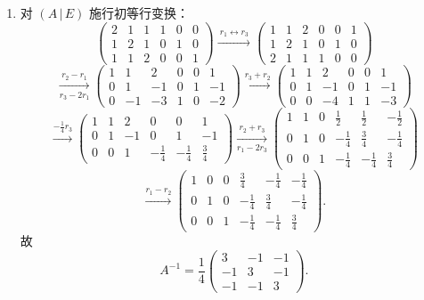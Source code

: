 \documentclass[12pt]{ctexart}
\begin{document}
\begin{enumerate}[label=\textbf{\arabic*.},itemsep=13pt]
\item 对 $(A\,|\,E)$ 施行初等行变换：
  \[
  \left(\begin{array}{ccc|ccc}
  2&1&1&1&0&0\\ 1&2&1&0&1&0\\ 1&1&2&0&0&1
  \end{array}\right)
  \xrightarrow{\ r_1\leftrightarrow r_3\ }
  \left(\begin{array}{ccc|ccc}
  1&1&2&0&0&1\\ 1&2&1&0&1&0\\ 2&1&1&1&0&0
  \end{array}\right)
  \]
  \[
  \xrightarrow[r_3-2r_1]{r_2-r_1}
  \left(\begin{array}{ccc|ccc}
  1&1&2&0&0&1\\ 0&1&-1&0&1&-1\\ 0&-1&-3&1&0&-2
  \end{array}\right)
  \xrightarrow{r_3+r_2}
  \left(\begin{array}{ccc|ccc}
  1&1&2&0&0&1\\ 0&1&-1&0&1&-1\\ 0&0&-4&1&1&-3
  \end{array}\right)
  \]
  \[
  \xrightarrow{-\frac14 r_3}
  \left(\begin{array}{ccc|ccc}
  1&1&2&0&0&1\\ 0&1&-1&0&1&-1\\ 0&0&1&-\frac14&-\frac14&\frac34
  \end{array}\right)
  \xrightarrow[r_1-2r_3]{r_2+r_3}
  \left(\begin{array}{ccc|ccc}
  1&1&0&\frac12&\frac12&-\frac12\\ 0&1&0&-\frac14&\frac34&-\frac14\\ 0&0&1&-\frac14&-\frac14&\frac34
  \end{array}\right)
  \]
  \[
  \xrightarrow{r_1-r_2}
  \left(\begin{array}{ccc|ccc}
  1&0&0&\frac34&-\frac14&-\frac14\\ 0&1&0&-\frac14&\frac34&-\frac14\\ 0&0&1&-\frac14&-\frac14&\frac34
  \end{array}\right).
  \]
  故
  \[
  A^{-1}=\frac14\begin{pmatrix}3&-1&-1\\-1&3&-1\\-1&-1&3\end{pmatrix}.
  \]


\end{enumerate}
\end{document}
